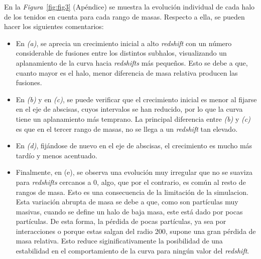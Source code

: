 \begin{comment}
La \textit{Figura}~\ref{fig:fig1} representa la evolución de los halos para cada rango de la \textit{Tabla}~\ref{tab:tabla2}. En general, se observan intervalos de crecimiento negativo, lo cuál no tiene una explicación física congruente. Estos decrecimientos son una consecuencia de las limitaciones del modelo y se explican entendiendo que, para un \textit{SnapNum} determinado, halos más pequeños salen fuera del radio 200 del halo principal (radio en que la sobredensidad es 200 veces la crítica de la simulación), dejando de ser considerados, sustrayendo así la masa correspondiente. Posteriormente, este decrecimiento se recupera gracias al colapso gravitacional. Los halos que habían salido vuelven a incluirse en el espacio que abarca el radio del virial del halo principal. \\
\end{comment}

En la \textit{Figura}~\ref{fig:fig3} (Apéndice) se muestra la evolución individual de cada halo de los tenidos en cuenta para cada rango de masas. Respecto a ella, se pueden hacer los siguientes comentarios:
\begin{itemize}
\item En \textit{(a)}, se aprecia un crecimiento inicial a alto \textit{redshift} con un número considerable de fusiones entre los distintos subhalos, visualizando un aplanamiento de la curva hacia \textit{redshifts} más pequeños. Esto se debe a que, cuanto mayor es el halo, menor diferencia de masa relativa producen las fusiones. 
\item En \textit{(b)} y en \textit{(c)}, se puede verificar que el crecimiento inicial es menor al fijarse en el eje de abscisas, cuyos intervalos se han reducido, por lo que la curva tiene un aplanamiento más temprano. La principal diferencia entre \textit{(b)} y \textit{(c)} es que en el tercer rango de masas, no se llega a un \textit{redshift} tan elevado. 
\item En \textit{(d)}, fijándose de nuevo en el eje de abscisas, el crecimiento es mucho más tardío y menos acentuado. 
\item Finalmente, en (e), se observa una evolución muy irregular que no se suaviza para \textit{redshifts} cercanos a 0, algo, que por el contrario, es común al resto de rangos de masa. Esto es una consecuencia de la limitación de la simulacion. Esta variación abrupta de masa se debe a que, como son partículas muy masivas, cuando se define un halo de baja masa, este está dado por pocas partículas. De esta forma, la pérdida de pocas partículas, ya sea por interacciones o porque estas salgan del radio 200, supone una gran pérdida de masa relativa. Esto reduce siginificativamente la posibilidad de una estabilidad en el comportamiento de la curva para ningún valor del \textit{redshift}.
\end{itemize}



